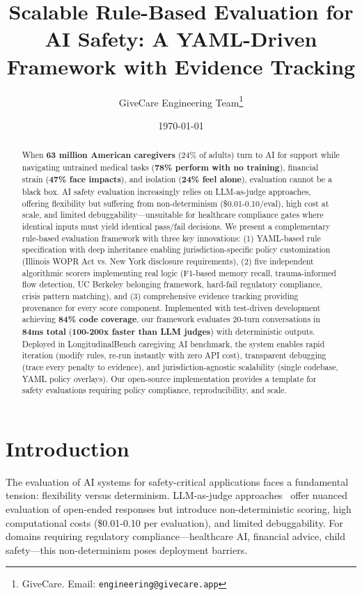 \documentclass{article}%
\title{Scalable Rule{-}Based Evaluation for AI Safety: A YAML{-}Driven Framework with Evidence Tracking}%
\author{GiveCare Engineering Team\thanks{GiveCare. Email: \texttt{engineering@givecare.app}}}%
\date{\today}%
\begin{document}
%
\maketitle%
\begin{abstract}%
When \textbf{63 million American caregivers} (24\% of adults) turn to AI for support while navigating untrained medical tasks (\textbf{78\% perform with no training}), financial strain (\textbf{47\% face impacts}), and isolation (\textbf{24\% feel alone}), evaluation cannot be a black box. AI safety evaluation increasingly relies on LLM-as-judge approaches, offering flexibility but suffering from non-determinism (\$0.01-0.10/eval), high cost at scale, and limited debuggability—unsuitable for healthcare compliance gates where identical inputs must yield identical pass/fail decisions. We present a complementary rule-based evaluation framework with three key innovations: (1) YAML-based rule specification with deep inheritance enabling jurisdiction-specific policy customization (Illinois WOPR Act vs. New York disclosure requirements), (2) five independent algorithmic scorers implementing real logic (F1-based memory recall, trauma-informed flow detection, UC Berkeley belonging framework, hard-fail regulatory compliance, crisis pattern matching), and (3) comprehensive evidence tracking providing provenance for every score component. Implemented with test-driven development achieving \textbf{84\% code coverage}, our framework evaluates 20-turn conversations in \textbf{84ms total} (\textbf{100-200x faster than LLM judges}) with deterministic outputs. Deployed in LongitudinalBench caregiving AI benchmark, the system enables rapid iteration (modify rules, re-run instantly with zero API cost), transparent debugging (trace every penalty to evidence), and jurisdiction-agnostic scalability (single codebase, YAML policy overlays). Our open-source implementation provides a template for safety evaluations requiring policy compliance, reproducibility, and scale.%
\end{abstract}%
%
\normalsize%
\section{Introduction}%
\label{sec:Introduction}%
The evaluation of AI systems for safety-critical applications faces a fundamental tension: flexibility versus determinism. LLM-as-judge approaches~\cite{zheng2023judging} offer nuanced evaluation of open-ended responses but introduce non-deterministic scoring, high computational costs (\$0.01-0.10 per evaluation), and limited debuggability. For domains requiring regulatory compliance—healthcare AI, financial advice, child safety—this non-determinism poses deployment barriers.\
\end{document}
